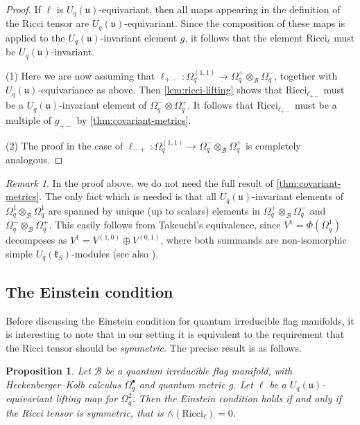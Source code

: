 \documentclass[a4paper,12pt,reqno,english]{amsart}
\numberwithin{equation}{section}
\numberwithin{figure}{section}
\theoremstyle{plain}
\theoremstyle{plain}
\theoremstyle{plain}
\newtheorem{proposition}[theorem]{Proposition}
\theoremstyle{plain}
\theoremstyle{plain}
\theoremstyle{definition}
\theoremstyle{definition}
\theoremstyle{definition}
\theoremstyle{remark}
\newtheorem{remark}[theorem]{Remark}
\theoremstyle{definition}
\newcommand{\Uqu}{U_q(\mathfrak{u})}
\newcommand{\UqkS}{U_q(\mathfrak{k}_S)}
\newcommand{\qalg}{\mathcal{B}}
\newcommand{\Ricci}{\mathrm{Ricci}}
\newcommand{\liftmap}{\ell}
\newcommand{\diffcalc}{\Omega_q}
\newcommand{\wedgemap}{\mathord{\wedge}}
\begin{document}
\begin{proof}
If $\liftmap$ is $\Uqu$-equivariant, then all maps appearing in the definition of the Ricci tensor are $\Uqu$-equivariant.
Since the composition of these maps is applied to the $\Uqu$-invariant element $g$, it follows that the element $\Ricci_\liftmap$ must be $\Uqu$-invariant.

(1) Here we are now assuming that $\liftmap_{+ -} : \diffcalc^{(1, 1)} \to \diffcalc^+ \otimes_\qalg \diffcalc^-$, together with $\Uqu$-equivariance as above.
Then \cref{lem:ricci-lifting} shows that $\Ricci_{\liftmap_{+ -}}$ must be a $\Uqu$-invariant element of $\diffcalc^- \otimes \diffcalc^+$.
It follows that $\Ricci_{\liftmap_{+ -}}$ must be a multiple of $g_{+ -}$ by \cref{thm:covariant-metrics}.

(2) The proof in the case of $\liftmap_{- +} : \diffcalc^{(1, 1)} \to \diffcalc^- \otimes_\qalg \diffcalc^+$ is completely analogous.
\end{proof}

\begin{remark}
In the proof above, we do not need the full result of \cref{thm:covariant-metrics}. The only fact which is needed is that all $\Uqu$-invariant elements of $\diffcalc^1 \otimes_\qalg \diffcalc^1$ are spanned by unique (up to scalars) elements in $\diffcalc^+ \otimes_\qalg \diffcalc^-$ and $\diffcalc^- \otimes_\qalg \diffcalc^+$.
This easily follows from Takeuchi's equivalence, since $V^1 = \Phi(\diffcalc^1)$ decomposes as $V^1 = V^{(1, 0)} \oplus V^{(0, 1)}$, where both summands are non-isomorphic simple $\UqkS$-modules (see also \cite[Lemma 6.8]{levicivita-irreducible}).
\end{remark}

\subsection{The Einstein condition}

Before discussing the Einstein condition for quantum irreducible flag manifolds, it is interesting to note that in our setting it is equivalent to the requirement that the Ricci tensor should be \emph{symmetric}. The precise result is as follows.

\begin{proposition}
Let $\qalg$ be a quantum irreducible flag manifold, with Heckenberger--Kolb calculus $\diffcalc^\bullet$ and quantum metric $g$.
Let $\liftmap$ be a $\Uqu$-equivariant lifting map for $\diffcalc^2$.
Then the Einstein condition holds if and only if the Ricci tensor is symmetric, that is $\wedgemap(\Ricci_\liftmap) = 0$.
\end{proposition}
\end{document}
